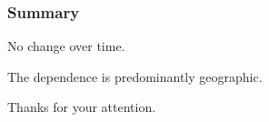 \documentclass{beamer}
\begin{document}
\begin{frame}
\frametitle{Summary}

No change over time.

The dependence is predominantly geographic.

Thanks for your attention.

\end{frame}
\end{document}
